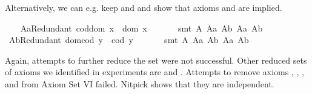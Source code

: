 \begin{isabellebody}
\begin{isamarkuptext}
Alternatively, we can e.g. keep  and  and show that axioms  
and  are implied.%
\end{isamarkuptext}\isamarkuptrue%
\ \ \isamarkupfalse%
\ A{}aRedundant{\isacharcolon}\ {\isachardoublequoteopen}cod{\isacharparenleft}dom\ x{\isacharparenright}\ {\isasymcong}\ dom\ x{\isachardoublequoteclose}\ \isanewline
%
\isadelimproof
\ \ \ \ %
\endisadelimproof
%
\isatagproof
{}\isamarkupfalse%
\ {\isacharparenleft}smt\ A{}\ A{}a\ A{}b\ A{}a\ A{}b{\isacharparenright}%
\endisatagproof
{\isafoldproof}%
%
\isadelimproof
\isanewline
%
\endisadelimproof
\ \ \isamarkupfalse%
\ A{}bRedundant{\isacharcolon}\ {\isachardoublequoteopen}dom{\isacharparenleft}cod\ y{\isacharparenright}\ {\isasymcong}\ cod\ y{\isachardoublequoteclose}\ \isanewline
%
\isadelimproof
\ \ \ \ %
\endisadelimproof
%
\isatagproof
{}\isamarkupfalse%
\ {\isacharparenleft}smt\ A{}\ A{}a\ A{}b\ A{}a\ A{}b{\isacharparenright}%
\endisatagproof
{\isafoldproof}%
%
\isadelimproof
%
\endisadelimproof
%
\begin{isamarkuptext}%
Again, attempts to further reduce the set  were not successful.
   Other reduced sets of axioms we identified in experiments are  and
    . Attempts to remove axioms , , 
    , and  from Axiom Set VI failed. Nitpick shows that they are independent. 


\end{isamarkuptext}
\end{isabellebody}
